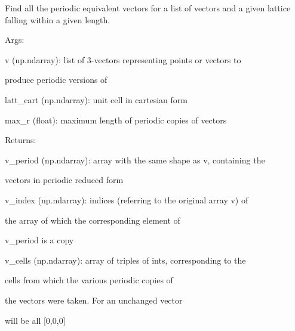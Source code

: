 \documentclass[letterpaper,10pt,english]{sphinxmanual}
\begin{document}
\begin{fulllineitems}
\label{doctree/soprano.utils:soprano.utils.all_periodic}
Find all the periodic equivalent vectors for a list of vectors and a
given lattice falling within a given length.

\begin{DUlineblock}{0em}
\item[] Args:
\item[]
\begin{DUlineblock}{\DUlineblockindent}
\item[] v (np.ndarray): list of 3-vectors representing points or vectors to
\item[]
\begin{DUlineblock}{\DUlineblockindent}
\item[] produce periodic versions of
\end{DUlineblock}
\item[] latt\_cart (np.ndarray): unit cell in cartesian form
\item[] max\_r (float): maximum length of periodic copies of vectors
\end{DUlineblock}
\end{DUlineblock}

\begin{DUlineblock}{0em}
\item[] Returns:
\item[]
\begin{DUlineblock}{\DUlineblockindent}
\item[] v\_period (np.ndarray): array with the same shape as v, containing the
\item[]
\begin{DUlineblock}{\DUlineblockindent}
\item[] vectors in periodic reduced form
\end{DUlineblock}
\item[] v\_index (np.ndarray): indices (referring to the original array v) of
\item[]
\begin{DUlineblock}{\DUlineblockindent}
\item[] the array of which the corresponding element of
\item[] v\_period is a copy
\end{DUlineblock}
\item[] v\_cells (np.ndarray): array of triples of ints, corresponding to the
\item[]
\begin{DUlineblock}{\DUlineblockindent}
\item[] cells from which the various periodic copies of
\item[] the vectors were taken. For an unchanged vector
\item[] will be all {[}0,0,0{]}
\end{DUlineblock}
\end{DUlineblock}
\end{DUlineblock}

\end{fulllineitems}
\end{document}
